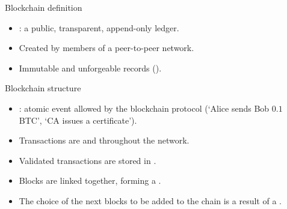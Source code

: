 \begin{frame}{Blockchain definition}

\begin{itemize}
\item {}: a public, transparent,
append-only ledger.
\item Created by members of a peer-to-peer
network.
\item Immutable and unforgeable records ().
\end{itemize}

\end{frame}



\begin{frame}{Blockchain structure}

\begin{itemize}
\item {}: atomic event
allowed by the blockchain protocol (`Alice sends Bob $0.1$ BTC', `CA issues a certificate').
\item Transactions are  and 
throughout the network.
\item Validated transactions are
stored in .
\item Blocks are linked together,
forming a .
\item The choice of the next blocks to be
added to the chain is a result of a .
\end{itemize}

\end{frame}



